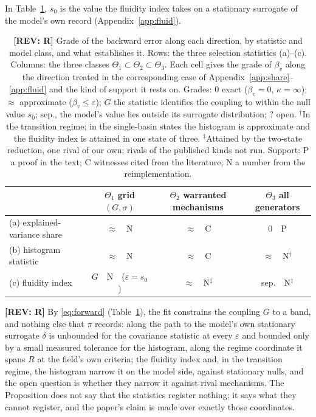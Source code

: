 \documentclass[11pt]{article}
\newcommand{\REV}[1]{\textcolor{purple!70!black}{\textbf{[REV: #1]}}}
\newenvironment{newtext}{\par\color{teal!55!black}}{\par}
\begin{document}
\begin{newtext}
In Table~\ref{tab:grid}, $s_0$ is the value the fluidity index takes on a stationary surrogate of the model's own record (Appendix~\ref{app:fluid}).
\end{newtext}

\begin{table}[htbp]\centering\small
\caption{\REV{R} Grade of the backward error along each direction, by statistic and model class, and what establishes it. Rows: the three selection statistics (a)--(c). Columns: the three classes $\Theta_1\subset\Theta_2\subset\Theta_3$. Each cell gives the grade of $\beta_v$ along the direction treated in the corresponding case of Appendix~\ref{app:share}--\ref{app:fluid} and the kind of support it rests on. Grades: $0$ exact ($\beta_v=0$, $\kappa=\infty$); $\approx$ approximate ($\beta_v\le\varepsilon$); $G$ the statistic identifies the coupling to within the null value $s_0$; sep., the model's value lies outside its surrogate distribution; $?$ open. $^{\dagger}$In the transition regime; in the single-basin states the histogram is approximate and the fluidity index is attained in one state of three. $^{\ddagger}$Attained by the two-state reduction, one rival of our own; rivals of the published kinds not run. Support: P a proof in the text; C witnesses cited from the literature; N a number from the reimplementation.}
\label{tab:grid}
\renewcommand{\arraystretch}{1.25}
\begin{tabular}{@{}l ccc@{}}
\toprule
 & $\Theta_1$ grid $(G,\sigma)$ & $\Theta_2$ warranted mechanisms & $\Theta_3$ all generators \\
\midrule
(a) explained-variance share & $\approx$\ \ N & $\approx$\ \ C & $0$\ \ P \\
(b) histogram statistic      & $\approx$\ \ N & $\approx$\ \ C & $\approx$\ \ N$^{\dagger}$ \\
(c) fluidity index           & $G$\ \ N\ \ ($\varepsilon=s_0$) & $\approx$\ \ N$^{\ddagger}$ & sep.\ \ N$^{\dagger}$ \\
\bottomrule
\end{tabular}
\end{table}

\REV{R} By \eqref{eq:forward} (Table~\ref{tab:grid}), the fit constrains the coupling $G$ to a band, and nothing else that $\pi$ records: along the path to the model's own stationary surrogate $\delta$ is unbounded for the covariance statistic at every $\varepsilon$ and bounded only by a small measured tolerance for the histogram, along the regime coordinate it spans $R$ at the field's own criteria; the fluidity index and, in the transition regime, the histogram narrow it on the model side, against stationary nulls, and the open question is whether they narrow it against rival mechanisms. The Proposition does not say that the statistics register nothing; it says what they cannot register, and the paper's claim is made over exactly those coordinates.
\end{document}

